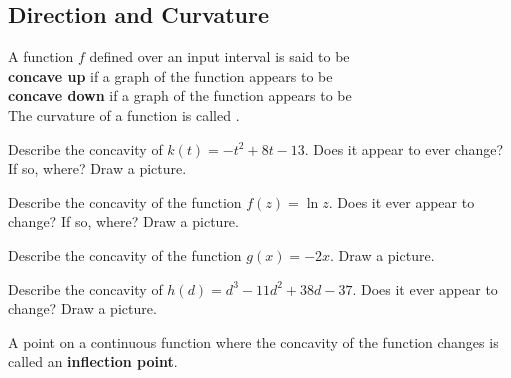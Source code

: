 \documentclass[notes]{subfiles}
\begin{document}
	\subsection*{Direction and Curvature}
		\begin{defn}[Concavity] A function $f$ defined over an input interval is said to be\\[5pt]
				\tabitem \textbf{concave up} if a graph of the function appears to be \\
				\tabitem \textbf{concave down} if a graph of the function appears to be \\
			The curvature of a function is called .  
		\end{defn}
		
		\begin{ex}
			Describe the concavity of $k(t)=-t^2 + 8t -13$.  Does it appear to ever change?  If so, where? Draw a picture.
		\end{ex}
			
		\begin{ex}
			Describe the concavity of the function $f(z) = \ln z$.  Does it ever appear to change?  If so, where? Draw a picture.
		\end{ex}
			
		\begin{ex}
			Describe the concavity of the function $g(x) = -2x$. Draw a picture.
		\end{ex}
			\newpage
		\begin{ex}
			Describe the concavity of $h(d) = d^3 - 11d^2 + 38d - 37$.  Does it ever appear to change?   Draw a picture.
		\end{ex}
		\begin{defn}
			A point on a continuous function where the concavity of the function changes is called an \textbf{inflection point}.
		\end{defn}
		
\end{document}
